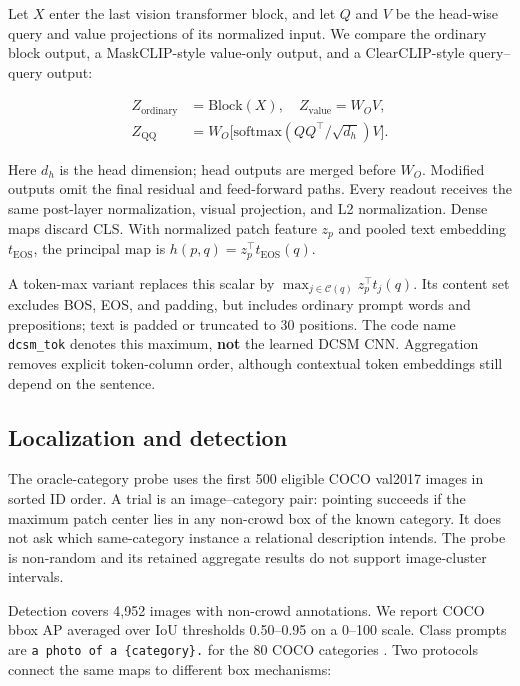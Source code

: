 \documentclass[10pt,twocolumn,letterpaper]{article}
\begin{document}
Let \(X\) enter the last vision transformer block, and let \(Q\) and
\(V\) be the head-wise query and value projections of its normalized
input. We compare the ordinary block output, a MaskCLIP-style value-only
output, and a ClearCLIP-style query--query output:

\[
\begin{aligned}
Z_{\mathrm{ordinary}}&=\mathrm{Block}(X),\quad Z_{\mathrm{value}}=W_O V,\\
Z_{\mathrm{QQ}}&=W_O\big[\mathrm{softmax}(QQ^\top/\sqrt{d_h})V\big].
\end{aligned}
\]

Here \(d_h\) is the head dimension; head outputs are merged before
\(W_O\). Modified outputs omit the final residual and feed-forward
paths. Every readout receives the same post-layer normalization, visual
projection, and L2 normalization. Dense maps discard CLS. With
normalized patch feature \(z_p\) and pooled text embedding
\(t_{\mathrm{EOS}}\), the principal map is
\(h(p,q)=z_p^\top t_{\mathrm{EOS}}(q)\).

A token-max variant replaces this scalar by
\(\max_{j\in\mathcal C(q)}z_p^\top t_j(q)\). Its content set excludes
BOS, EOS, and padding, but includes ordinary prompt words and
prepositions; text is padded or truncated to 30 positions. The code name
\texttt{dcsm\_tok} denotes this maximum, \textbf{not} the learned DCSM
CNN. Aggregation removes explicit token-column order, although
contextual token embeddings still depend on the sentence.

\subsection{Localization and
detection}\label{localization-and-detection}

The oracle-category probe uses the first 500 eligible COCO val2017
images in sorted ID order. A trial is an image--category pair: pointing
succeeds if the maximum patch center lies in any non-crowd box of the
known category. It does not ask which same-category instance a
relational description intends. The probe is non-random and its retained
aggregate results do not support image-cluster intervals.

Detection covers 4,952 images with non-crowd annotations. We report COCO
bbox AP averaged over IoU thresholds 0.50--0.95 on a 0--100 scale. Class
prompts are \texttt{a\ photo\ of\ a\ \{category\}.} for the 80 COCO
categories \citep{lin2014coco}. Two protocols connect the same maps to
different box mechanisms:
\end{document}
